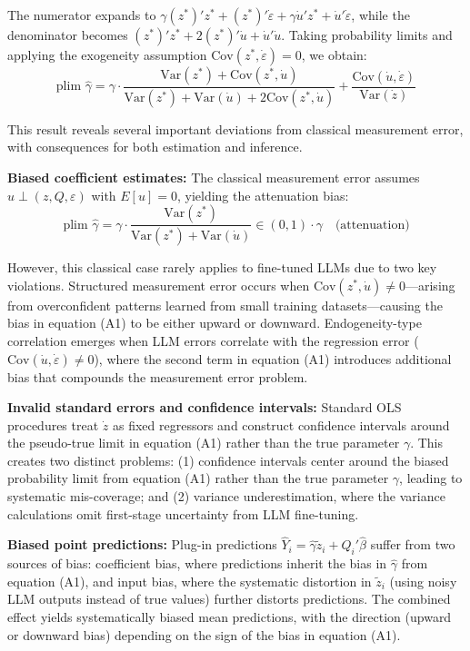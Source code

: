 \documentclass[11pt]{article}
\begin{document}
The numerator expands to $\gamma (z^*)' z^* + (z^*)' \dot{\varepsilon} + \gamma \dot{u}' z^* + \dot{u}' \dot{\varepsilon}$, while the denominator becomes $(z^*)' z^* + 2(z^*)' \dot{u} + \dot{u}' \dot{u}$. Taking probability limits and applying the exogeneity assumption $\text{Cov}(z^*, \dot{\varepsilon}) = 0$, we obtain:
\begin{equation}
\text{plim } \hat{\gamma} = \gamma \cdot \frac{\text{Var}(z^*) + \text{Cov}(z^*, \dot{u})}{\text{Var}(z^*) + \text{Var}(\dot{u}) + 2\text{Cov}(z^*, \dot{u})} + \frac{\text{Cov}(\dot{u}, \dot{\varepsilon})}{\text{Var}(\dot{z})} \tag{A1}
\end{equation}

This result reveals several important deviations from classical measurement error, with consequences for both estimation and inference.

\textbf{Biased coefficient estimates:} The classical measurement error assumes $u \perp (z, Q, \varepsilon)$ with $E[u] = 0$,
yielding the attenuation bias:
\begin{equation}
\text{plim } \hat{\gamma} = \gamma \cdot \frac{\text{Var}(z^*)}{\text{Var}(z^*) + \text{Var}(\dot{u})} \in (0,1) \cdot \gamma \quad \text{(attenuation)} \tag{A2}
\end{equation}

However, this classical case rarely applies to fine-tuned LLMs due to two key violations. 
Structured measurement error occurs when $\text{Cov}(z^*, \dot{u}) \neq 0$—arising from overconfident 
patterns learned from small training datasets—causing the bias in equation (A1) to be either upward or downward. 
Endogeneity-type correlation emerges when LLM errors correlate with the regression error ($\text{Cov}(\dot{u}, \dot{\varepsilon}) \neq 0$), 
where the second term in equation (A1) introduces additional bias that compounds the measurement error problem.

\textbf{Invalid standard errors and confidence intervals:} Standard OLS procedures treat $\dot{z}$ as fixed regressors and construct confidence intervals 
around the pseudo-true limit in equation (A1) rather than the true parameter $\gamma$. 
This creates two distinct problems: (1) confidence intervals center around the biased probability limit from equation (A1)
rather than the true parameter $\gamma$, leading to systematic mis-coverage; and (2) variance underestimation,
where the variance calculations omit first-stage uncertainty from LLM fine-tuning.

\textbf{Biased point predictions:} Plug-in predictions $\hat{Y}_i = \hat{\gamma} \tilde{z}_i + Q_i'\hat{\beta}$ 
suffer from two sources of bias: coefficient bias, where predictions inherit the bias in $\hat{\gamma}$ from equation (A1),
and input bias, where the systematic distortion in $\tilde{z}_i$
(using noisy LLM outputs instead of true values) further distorts predictions. 
The combined effect yields systematically biased mean predictions, with the direction (upward or downward bias)
depending on the sign of the bias in equation (A1).
\end{document}
